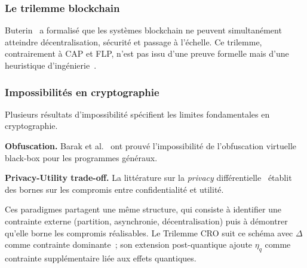 \begin{sloppypar}
\subsubsection{Le trilemme blockchain}
\label{subsubsec:trilemme_blockchain}

Buterin~\cite{Buterin17} a formalis\'e que les syst\`emes blockchain ne peuvent
simultan\'ement atteindre d\'ecentralisation, s\'ecurit\'e et passage \`a l'\'echelle. Ce trilemme, contrairement \`a CAP et FLP, n'est pas issu d'une preuve
formelle mais d'une heuristique d'ing\'enierie~\cite{Nakamoto08,Garay15,Narayanan16}.

\subsubsection{Impossibilit\'es en cryptographie}
\label{subsubsec:impossibilites_crypto}

Plusieurs r\'esultats d'impossibilit\'e sp\'ecifient les limites fondamentales en cryptographie.

\textbf{Obfuscation.} Barak et al.~\cite{Barak2001} ont prouv\'e l'impossibilit\'e
de l'obfuscation virtuelle black-box pour les programmes g\'en\'eraux.

\textbf{Privacy-Utility trade-off.} La litt\'erature sur la \textit{privacy}
diff\'erentielle~\cite{Dwork} \'etablit des bornes sur les compromis entre
confidentialit\'e et utilit\'e.

\medskip
Ces paradigmes partagent une m\^eme structure, qui consiste \`a identifier une
contrainte externe (partition, asynchronie, d\'ecentralisation) puis \`a
d\'emontrer qu'elle borne les compromis r\'ealisables. Le Trilemme CRO suit ce
sch\'ema avec $\Delta$ comme contrainte dominante~; son extension post-quantique
ajoute $\eta_q$ comme contrainte suppl\'ementaire li\'ee aux effets quantiques.
\end{sloppypar}

